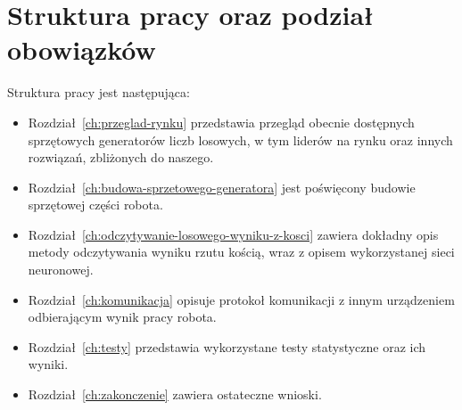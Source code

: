 \section{Struktura pracy oraz podział obowiązków}\label{sec:struktura-pracy-oraz-podzia-obowiazkow}

Struktura pracy jest następująca:
\begin{itemize}
    \item Rozdział~\ref{ch:przeglad-rynku} przedstawia przegląd obecnie dostępnych sprzętowych generatorów liczb losowych,
    w tym liderów na rynku oraz innych rozwiązań, zbliżonych do naszego.
    \item Rozdział~\ref{ch:budowa-sprzetowego-generatora} jest poświęcony budowie sprzętowej części robota.
    \item Rozdział~\ref{ch:odczytywanie-losowego-wyniku-z-kosci} zawiera dokładny opis metody odczytywania wyniku rzutu kością,
    wraz z opisem wykorzystanej sieci neuronowej.
    \item Rozdział~\ref{ch:komunikacja} opisuje protokoł komunikacji z innym urządzeniem odbierającym wynik pracy robota. 
    \item Rozdział~\ref{ch:testy} przedstawia wykorzystane testy statystyczne oraz ich wyniki.
    \item Rozdział~\ref{ch:zakonczenie} zawiera ostateczne wnioski.
\end{itemize}

